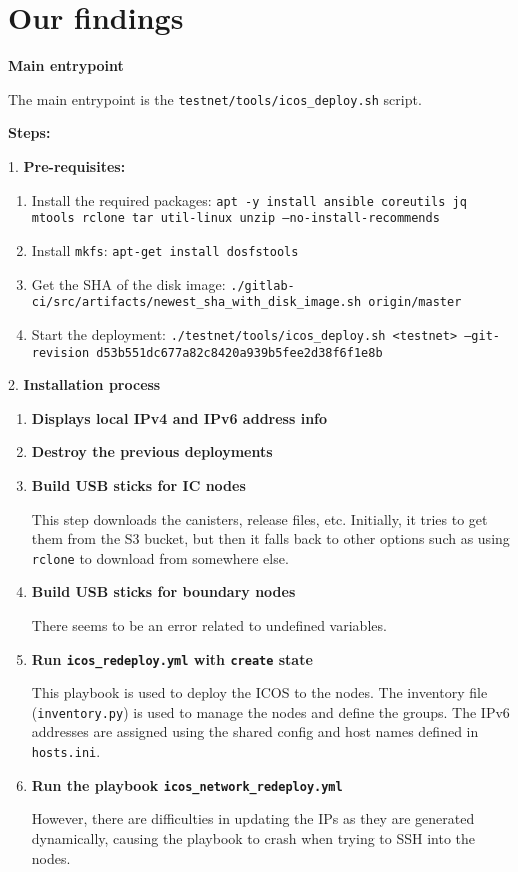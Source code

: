 \section{Our findings}

\textbf{Main entrypoint}

The main entrypoint is the \texttt{testnet/tools/icos\_deploy.sh} script.

\textbf{Steps:}

1. \textbf{Pre-requisites:}
    \begin{enumerate}
        \item Install the required packages:
        \texttt{apt -y install ansible coreutils jq mtools rclone tar util-linux unzip --no-install-recommends}
        \item Install \texttt{mkfs}:
        \texttt{apt-get install dosfstools}
        \item Get the SHA of the disk image:
        \texttt{./gitlab-ci/src/artifacts/newest\_sha\_with\_disk\_image.sh origin/master}
        \item Start the deployment:
        \texttt{./testnet/tools/icos\_deploy.sh <testnet> --git-revision d53b551dc677a82c8420a939b5fee2d38f6f1e8b}
    \end{enumerate}

2. \textbf{Installation process}
    
    \begin{enumerate}
        \item \textbf{Displays local IPv4 and IPv6 address info}
        \item \textbf{Destroy the previous deployments}
        \item \textbf{Build USB sticks for IC nodes}
        
        This step downloads the canisters, release files, etc. Initially, it tries to get them from the S3 bucket, but then it 
        falls back to other options such as using \texttt{rclone} to download from somewhere else.
        
        \item \textbf{Build USB sticks for boundary nodes}
        
        There seems to be an error related to undefined variables.
        
        \item \textbf{Run \texttt{icos\_redeploy.yml} with \texttt{create} state}
        
        This playbook is used to deploy the ICOS to the nodes. The inventory file (\texttt{inventory.py}) is used to manage the 
        nodes and define the groups. The IPv6 addresses are assigned using the shared config and host names defined in \texttt
        {hosts.ini}.
        
        \item \textbf{Run the playbook \texttt{icos\_network\_redeploy.yml}}
        
        However, there are difficulties in updating the IPs as they are generated dynamically, causing the playbook to crash 
        when trying to SSH into the nodes.
    \end{enumerate}


